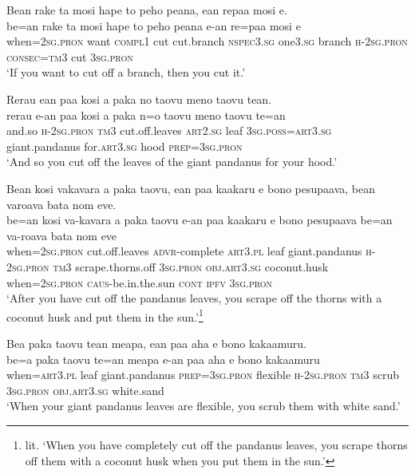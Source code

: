 \ea\label{ex:text10-7}
Bean rake ta mosi hape to peho peana, ean repaa mosi e.\\
\gll be=an	rake	ta	mosi	hape	to	peho	peana	e-an	re=paa	mosi	e\\
     when=2\textsc{sg}.\textsc{pron}	want	\textsc{compl}1	cut	cut.branch	\textsc{nspec}3.\textsc{sg}	one3.\textsc{sg}	branch	\textsc{h}-2\textsc{sg}.\textsc{pron}	\textsc{consec}=\textsc{tm}3	cut	3\textsc{sg}.\textsc{pron}\\
\glt `If you want to cut off a branch, then you cut it.'
\z

\ea\label{ex:text10-8}
Rerau ean paa kosi a paka no taovu meno taovu tean.\\
\gll rerau	e-an	paa	kosi	a	paka	n=o	taovu	meno	taovu	te=an\\
     and.so	\textsc{h}-2\textsc{sg}.\textsc{pron}	\textsc{tm}3	cut.off.leaves	\textsc{art}2.\textsc{sg}	leaf	3\textsc{sg}.\textsc{poss}=\textsc{art}3.\textsc{sg}	giant.pandanus	for.\textsc{art}3.\textsc{sg}	hood	\textsc{prep}=3\textsc{sg}.\textsc{pron}\\
\glt `And so you cut off the leaves of the giant pandanus for your hood.'
\z

\ea\label{ex:text10-9}
Bean kosi vakavara a paka taovu, ean paa kaakaru e bono pesupaava, bean varoava bata nom eve.\\
\gll be=an	kosi	va-kavara	a	paka	taovu	e-an	paa	kaakaru	e	bono	pesupaava	be=an	va-roava	bata	nom	eve\\
     when=2\textsc{sg}.\textsc{pron}	cut.off.leaves	\textsc{advr}-complete	\textsc{art}3.\textsc{pl}	leaf	giant.pandanus	\textsc{h}-2\textsc{sg}.\textsc{pron}	\textsc{tm}3	scrape.thorns.off	3\textsc{sg}.\textsc{pron}	\textsc{obj}.\textsc{art}3.\textsc{sg}	coconut.husk	when=2\textsc{sg}.\textsc{pron}	\textsc{caus}-be.in.the.sun	\textsc{cont}	\textsc{ipfv}	3\textsc{sg}.\textsc{pron}\\
\glt `After you have cut off the pandanus leaves, you scrape off the thorns with a coconut husk and put them in the sun.'\footnote{lit. `When you have completely cut off the pandanus leaves, you scrape thorns off them with a coconut husk when you put them in the sun.'}
\z

\ea\label{ex:text10-10}
Bea paka taovu tean meapa, ean paa aha e bono kakaamuru.\\
\gll be=a	paka	taovu	te=an	meapa	e-an	paa	aha	e	bono	kakaamuru\\
     when=\textsc{art}3.\textsc{pl}	leaf	giant.pandanus	\textsc{prep}=3\textsc{sg}.\textsc{pron}	flexible	\textsc{h}-2\textsc{sg}.\textsc{pron}	\textsc{tm}3	scrub	3\textsc{sg}.\textsc{pron}	\textsc{obj}.\textsc{art}3.\textsc{sg}	white.sand\\
\glt `When your giant pandanus leaves are flexible, you scrub them with white sand.'
\z

